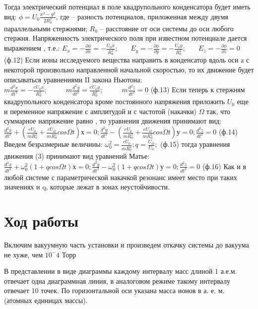 \documentclass[a4paper,12pt]{article}
\begin{document}
Тогда  электрический потенциал в поле квадрупольного конденсатора будет иметь вид:  $\phi=U_0\frac{x^2-y^2}{2R_0^2}$, где   – разность потенциалов, приложенная между двумя параллельными стержнями; $R_0$ – расстояние от оси системы до оси любого стержня. Напряженность  электрического поля при известном потенциале дается выражением  ,  т.е.: $ E_x=-\frac{\partial\phi}{\partial x}=-\frac{U_0x}{R_0^2};{\ }\mathrm{\ \ \ \ \ \ \ }E_y=-\frac{\partial\phi}{\partial y}=-\frac{U_0y}{R_0^2};{\ }\mathrm{\ \ \ \ \ \ \ }E_z=-\frac{\partial\phi}{\partial z}=0    $       (ф.12)
Если ионы исследуемого вещества направить в конденсатор вдоль оси z с некоторой  произвольно направленной начальной скоростью, то их движение будет описываться уравнениями II закона Ньютона:$
m\frac{d^2x}{dt^2}=-\frac{eU_0x}{R_0^2};{\ }\mathrm{\ \ \ \ \ \ \ \ \ \ \ }m\frac{d^2y}{dt^2}=\frac{eU_0y}{R_0^2};{\ }\mathrm{\ \ \ \ \ \ \ \ \ \ \ }m\frac{d^2z}{dt^2}=0     $                                    (ф.13)
Если теперь к стержням квадрупольного конденсатора кроме постоянного напряжения  приложить  $U_0$  еще и переменное напряжение с амплитудой   и  с частотой (накачки) $\Omega$ так, что суммарное напряжение равно  ,  то уравнения движения принимают   вид:
$\frac{d^2x}{dt^2}+\left(\frac{eU_0}{mR_0^2}+\frac{eU_\Omega}{mR_0^2}cos{\Omega}t\right)х=0;   \frac{d^2y}{dt^2}-\left(\frac{eU_0}{mR_0^2}+\frac{eU_{\Omega}}{ mR_0^2}cos\Omega t \right) у=0;\frac{d^2z}{dt^2}=0$   (ф.14)
Введем  безразмерные величины: $\omega_0^2=\frac{eU_0}{mR_0^2};     q=\frac{U_\Omega}{U_0};                    $ (ф.15)
тогда уравнения движения (3)  принимают вид уравнений Матье:
   $ \frac{d^2x}{dt^2}+\omega_0^2\left(1+qcos{\Omega}t\right)х=0;        \frac{d^2y}{dt^2}-\omega_0^2(1+qcos\Omega t)у=0;\frac{d^2z}{dt^2}=0                         $ (ф.16)
                 Как и в любой системе с параметрической накачкой  резонанс имеет место при  таких значениях  и q, которые лежат в зонах неустойчивости.  

\newpage

\section*{Ход работы}

Включим вакуумную часть установки и произведем откачку системы до вакуума не хуже, чем $10^-4$ Торр

В представлении в виде диаграммы каждому интервалу масс длиной 1 а.е.м. отвечает одна диаграммная линия, в аналоговом режиме такому интервалу отвечает 10 точек. По горизонтальной оси указана масса ионов в а. е. м. (атомных единицах массы).
\end{document}
